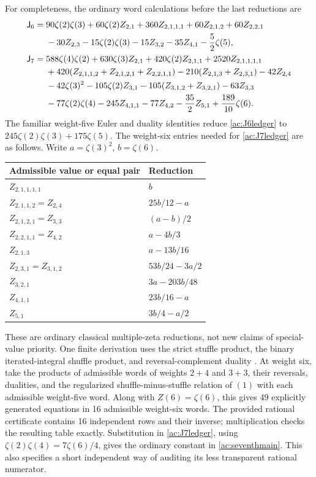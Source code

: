 For completeness, the ordinary word calculations before the last
reductions are
\begin{align}\label{ac:J6ledger}
 \mathsf J_6={}&90\zeta(2)\zeta(3)+60\zeta(2)Z_{2,1}
       +360Z_{2,1,1,1}+60Z_{2,1,2}+60Z_{2,2,1}\notag\\
 &-30Z_{2,3}-15\zeta(2)\zeta(3)-15Z_{3,2}
       -35Z_{4,1}-\frac52\zeta(5),\\
 \mathsf J_7={}&588\zeta(4)\zeta(2)+630\zeta(3)Z_{2,1}
       +420\zeta(2)Z_{2,1,1}+2520Z_{2,1,1,1,1}\notag\\
 &+420(Z_{2,1,1,2}+Z_{2,1,2,1}+Z_{2,2,1,1})
       -210(Z_{2,1,3}+Z_{2,3,1})-42Z_{2,4}\notag\\
 &-42\zeta(3)^2-105\zeta(2)Z_{3,1}
       -105(Z_{3,1,2}+Z_{3,2,1})-63Z_{3,3}\notag\\
 &-77\zeta(2)\zeta(4)-245Z_{4,1,1}-77Z_{4,2}
       -\frac{35}{2}Z_{5,1}+\frac{189}{10}\zeta(6).
       \label{ac:J7ledger}
\end{align}
The familiar weight-five Euler and duality identities reduce
\eqref{ac:J6ledger} to $245\zeta(2)\zeta(3)+175\zeta(5)$.
The weight-six entries needed for \eqref{ac:J7ledger} are as
follows. Write $a=\zeta(3)^2$, $b=\zeta(6)$.
\begin{center}
\small
\begin{tabular}{ll}
\hline
Admissible value or equal pair & Reduction\\
\hline
$Z_{2,1,1,1,1}$ & $b$\\
$Z_{2,1,1,2}=Z_{2,4}$ & $25b/12-a$\\
$Z_{2,1,2,1}=Z_{3,3}$ & $(a-b)/2$\\
$Z_{2,2,1,1}=Z_{4,2}$ & $a-4b/3$\\
$Z_{2,1,3}$ & $a-13b/16$\\
$Z_{2,3,1}=Z_{3,1,2}$ & $53b/24-3a/2$\\
$Z_{3,2,1}$ & $3a-203b/48$\\
$Z_{4,1,1}$ & $23b/16-a$\\
$Z_{5,1}$ & $3b/4-a/2$\\
\hline
\end{tabular}
\end{center}
These are ordinary classical multiple-zeta reductions, not new
claims of special-value priority. One finite derivation uses the
strict stuffle product, the binary iterated-integral shuffle product,
and reversal-complement duality \cite{IKZ}. At weight six,
take the products of admissible words of weights $2+4$ and $3+3$,
their reversals, dualities, and the regularized shuffle-minus-stuffle
relation of $(1)$ with each admissible weight-five word. Along with
$Z(6)=\zeta(6)$, this gives 49 explicitly generated equations in
16 admissible weight-six words. The provided rational certificate
contains 16 independent rows and their inverse; multiplication
checks the resulting table exactly. Substitution in
\eqref{ac:J7ledger}, using
$\zeta(2)\zeta(4)=7\zeta(6)/4$, gives the ordinary constant in
\eqref{ac:seventhmain}. This also specifies a short independent
way of auditing its less transparent rational numerator.

